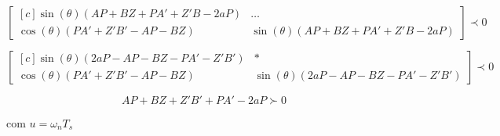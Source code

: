 \begin{equation}
  \begin{bmatrix*}[c]
    \sin{(\theta)(AP + BZ + PA' + Z'B -2aP)} &  \dots \\
    \cos{(\theta)(PA' + Z'B'- AP - BZ)}      &  \sin{(\theta)(AP + BZ + PA' + Z'B -2aP)}
  \end{bmatrix*}
  \prec 0\label{eq:LMIESetorConicoEsquerdo}
\end{equation}

\begin{equation}
  \begin{bmatrix*}[c]
    \sin{(\theta)(2aP - AP - BZ - PA' - Z'B')} & * \\
    \cos{(\theta)(PA' + Z'B' - AP - BZ)}       & \sin{(\theta)(2aP - AP - BZ - PA' - Z'B')}
  \end{bmatrix*}
  \prec 0\label{eq:LMIESetorConicoDireito}
\end{equation}

\begin{equation}
  AP + BZ + Z'B' + PA' -2aP\label{eq:LMIRightBounded} \succ 0
\end{equation}

com $u = \omega_nT_s$